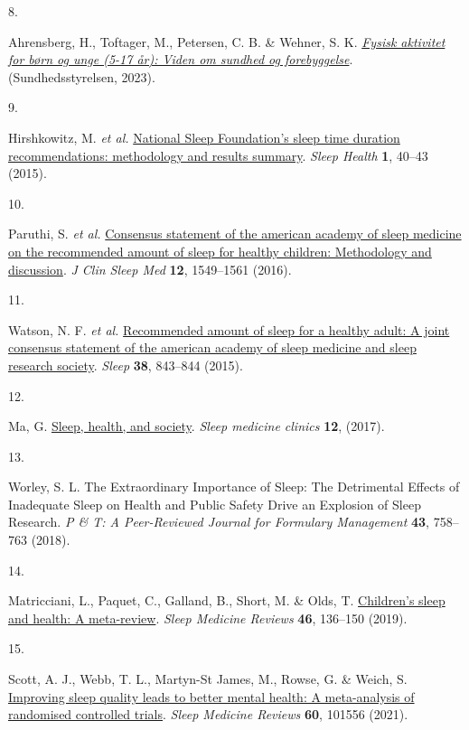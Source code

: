 \documentclass[
  10pt,
]{scrbook}
\newlength{\cslhangindent}
\newlength{\csllabelwidth}
\newlength{\cslentryspacingunit} %
\newenvironment{CSLReferences}[2] %
 {%
  \setlength{\parindent}{0pt}
  \ifodd #1
  \let\oldpar\par
  \def\par{\hangindent=\cslhangindent\oldpar}
  \fi
  \setlength{\parskip}{#2\cslentryspacingunit}
 }%
 {}
\newcommand{\CSLLeftMargin}[1]{\parbox[t]{\csllabelwidth}{#1}}
\newcommand{\CSLRightInline}[1]{\parbox[t]{\linewidth - \csllabelwidth}{#1}\break}
\let\originaltextbf\textbf
\renewcommand{\textbf}[1]{\textcolor{color1}{\textsf{\originaltextbf{#1}}}}
\begin{document}
\begin{CSLReferences}{0}{0}
\leavevmode{}%
\CSLLeftMargin{8. }%
\CSLRightInline{Ahrensberg, H., Toftager, M., Petersen, C. B. \& Wehner,
S. K. \emph{\href{https://www.sst.dk}{Fysisk aktivitet for børn og unge
(5-17 år): Viden om sundhed og forebyggelse}}. (Sundhedsstyrelsen,
2023).}

\leavevmode{}%
\CSLLeftMargin{9. }%
\CSLRightInline{Hirshkowitz, M. \emph{et al.}
\href{https://doi.org/10.1016/j.sleh.2014.12.010}{National Sleep
Foundation's sleep time duration recommendations: methodology and
results summary}. \emph{Sleep Health} \textbf{1}, 40--43 (2015).}

\leavevmode{}%
\CSLLeftMargin{10. }%
\CSLRightInline{Paruthi, S. \emph{et al.}
\href{https://doi.org/10.5664/jcsm.6288}{Consensus statement of the
american academy of sleep medicine on the recommended amount of sleep
for healthy children: Methodology and discussion}. \emph{J Clin Sleep
Med} \textbf{12}, 1549--1561 (2016).}

\leavevmode{}%
\CSLLeftMargin{11. }%
\CSLRightInline{Watson, N. F. \emph{et al.}
\href{https://doi.org/10.5665/sleep.4716}{Recommended amount of sleep
for a healthy adult: A joint consensus statement of the american academy
of sleep medicine and sleep research society}. \emph{Sleep} \textbf{38},
843--844 (2015).}

\leavevmode{}%
\CSLLeftMargin{12. }%
\CSLRightInline{Ma, G.
\href{https://doi.org/10.1016/j.jsmc.2016.10.012}{Sleep, health, and
society}. \emph{Sleep medicine clinics} \textbf{12}, (2017).}

\leavevmode{}%
\CSLLeftMargin{13. }%
\CSLRightInline{Worley, S. L. The Extraordinary Importance of Sleep: The
Detrimental Effects of Inadequate Sleep on Health and Public Safety
Drive an Explosion of Sleep Research. \emph{P \& T: A Peer-Reviewed
Journal for Formulary Management} \textbf{43}, 758--763 (2018).}

\leavevmode{}%
\CSLLeftMargin{14. }%
\CSLRightInline{Matricciani, L., Paquet, C., Galland, B., Short, M. \&
Olds, T. \href{https://doi.org/10.1016/j.smrv.2019.04.011}{Children's
sleep and health: A meta-review}. \emph{Sleep Medicine Reviews}
\textbf{46}, 136--150 (2019).}

\leavevmode{}%
\CSLLeftMargin{15. }%
\CSLRightInline{Scott, A. J., Webb, T. L., Martyn-St James, M., Rowse,
G. \& Weich, S.
\href{https://doi.org/10.1016/j.smrv.2021.101556}{Improving sleep
quality leads to better mental health: A meta-analysis of randomised
controlled trials}. \emph{Sleep Medicine Reviews} \textbf{60}, 101556
(2021).}


\end{CSLReferences}
\end{document}
